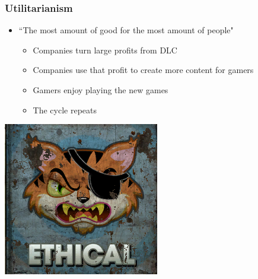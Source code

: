 \documentclass{beamer}
\begin{document}
\begin{frame}
\frametitle{Utilitarianism}
\begin{itemize}
\item ``The most amount of good for the most amount of people"
\pause
\begin{itemize}
\item Companies turn large profits from DLC
\pause
\item Companies use that profit to create more content for gamers
\pause
\item Gamers enjoy playing the new games
\pause
\item The cycle repeats
\end{itemize}
\end{itemize}
\pause
\begin{center}
\includegraphics[scale=0.3]{ethical}
\end{center}
\end{frame}
\end{document}
